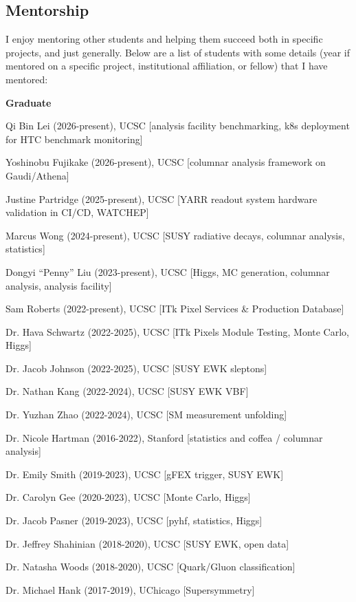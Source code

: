\documentclass[margin,line]{resume}
\let\origsection\section%
\let\section\subsection%
\let\section\origsection%
\begin{document}
\begin{resume}
\section{\mysidestyle Mentorship}
I enjoy mentoring other students and helping them succeed both in specific projects, and just generally. Below are a list of students with some details (year if mentored on a specific project, institutional affiliation, or fellow) that I have mentored:

\textbf{Graduate}
\begin{list2}
  \item Qi Bin Lei (2026-present), UCSC [analysis facility benchmarking, k8s deployment for HTC benchmark monitoring]
  \item Yoshinobu Fujikake (2026-present), UCSC [columnar analysis framework on Gaudi/Athena]
  \item Justine Partridge (2025-present), UCSC [YARR readout system hardware validation in CI/CD, WATCHEP]
  \item Marcus Wong (2024-present), UCSC [SUSY radiative decays, columnar analysis, statistics]
  \item Dongyi ``Penny'' Liu (2023-present), UCSC [Higgs, MC generation, columnar analysis, analysis facility]
  \item Sam Roberts (2022-present), UCSC [ITk Pixel Services \& Production Database]
  \item Dr. Hava Schwartz (2022-2025), UCSC [ITk Pixels Module Testing, Monte Carlo, Higgs]
  \item Dr. Jacob Johnson (2022-2025), UCSC [SUSY EWK sleptons]
  \item Dr. Nathan Kang (2022-2024), UCSC [SUSY EWK VBF]
  \item Dr. Yuzhan Zhao (2022-2024), UCSC [SM measurement unfolding]
  \item Dr. Nicole Hartman (2016-2022), Stanford [statistics and coffea / columnar analysis]
  \item Dr. Emily Smith (2019-2023), UCSC [gFEX trigger, SUSY EWK]
  \item Dr. Carolyn Gee (2020-2023), UCSC [Monte Carlo, Higgs]
  \item Dr. Jacob Pasner (2019-2023), UCSC [pyhf, statistics, Higgs]
  \item Dr. Jeffrey Shahinian (2018-2020), UCSC [SUSY EWK, open data]
  \item Dr. Natasha Woods (2018-2020), UCSC [Quark/Gluon classification]
  \item Dr. Michael Hank (2017-2019), UChicago [Supersymmetry]
\end{list2}


\end{resume}
\end{document}
